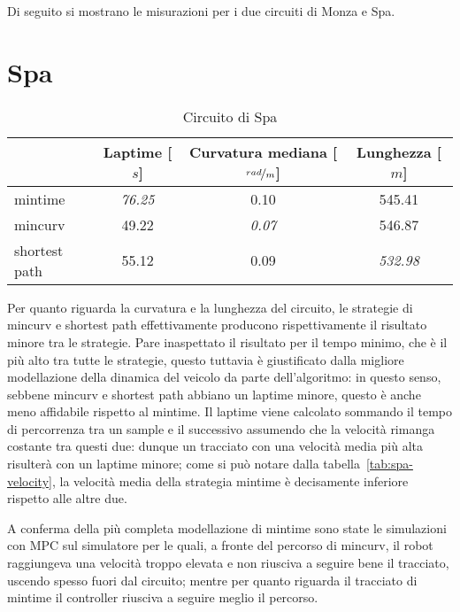 Di seguito si mostrano le misurazioni per i due circuiti di Monza e Spa.

\section{Spa}
\label{sec:spa}
\begin{table}[H]
	\caption{Circuito di Spa}
	\label{tab:opt-spa}
	\begin{center}
		\begin{tabular} {l|c|c|c}
			                & Laptime [$s$]  & Curvatura mediana [$\nicefrac{rad}{m}$] & Lunghezza [$m$]\\
			\hline
			mintime         & \textit{76.25} & 0.10           & 545.41          \\
			mincurv         & 49.22          & \textit{0.07 } & 546.87          \\
			shortest path   & 55.12          & 0.09           & \textit{532.98} \\
			\hline
		\end{tabular}
	\end{center}
\end{table}
Per quanto riguarda la curvatura e la lunghezza del circuito, le strategie di mincurv e shortest path
effettivamente producono rispettivamente il risultato minore tra le strategie. Pare inaspettato il
risultato per il tempo minimo, che è il più alto tra tutte le strategie, questo tuttavia è giustificato
dalla migliore modellazione della dinamica del veicolo da parte dell'algoritmo: in questo senso, sebbene
mincurv e shortest path abbiano un laptime minore, questo è anche meno affidabile rispetto al mintime. Il
laptime viene calcolato sommando il tempo di percorrenza tra un sample e il successivo assumendo che la
velocità rimanga costante tra questi due: dunque un tracciato con una velocità media più alta risulterà
con un laptime minore; come si può notare dalla tabella~\ref{tab:spa-velocity}, la velocità media della
strategia mintime è decisamente inferiore rispetto alle altre due.

A conferma della più completa modellazione di mintime sono state le simulazioni con MPC sul
simulatore per le quali, a fronte del percorso di mincurv, il robot raggiungeva una velocità troppo
elevata e non riusciva a seguire bene il tracciato, uscendo spesso fuori dal circuito; mentre per quanto
riguarda il tracciato di mintime il controller riusciva a seguire meglio il percorso.

